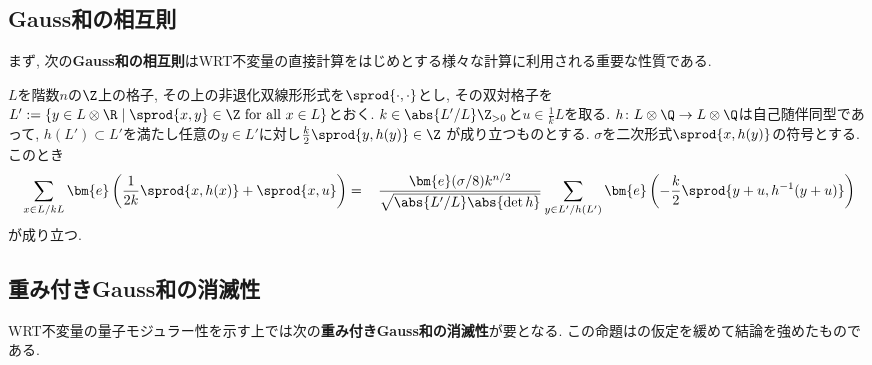 \documentclass[11pt,b5paper,oneside,lualatex]{ltjsarticle} %
\numberwithin{equation}{section} %
\begin{document}

\subsection{Gauss和の相互則} \label{subsec:reciprocity}


まず, 次の\textbf{Gauss和の相互則}はWRT不変量の直接計算をはじめとする様々な計算に利用される重要な性質である. 

\begin{prop}[{\cite[Theorem 1]{DT}}] \label{prop:reciprocity}
	$ L $を階数$ n $の$ \Z $上の格子, その上の非退化双線形形式を$ \sprod{\cdot, \cdot} $とし, その双対格子を
	$ L' := \{ y \in L \otimes \R \mid \sprod{x, y} \in \Z \text{ for all } x \in L \} $とおく.
	$ k \in \abs{L'/L} \Z_{>0} $と$ u \in \frac{1}{k} L $を取る. 
	$ h \colon L \otimes \Q \to L \otimes \Q $は自己随伴同型であって, $ h(L') \subset L' $を満たし任意の$ y \in L' $に対し$ \frac{k}{2} \sprod{y, h(y)} \in \Z $ が成り立つものとする. 
	$ \sigma $を二次形式$ \sprod{x, h(y)} $の符号とする. 
	このとき
	\begin{align}
		&\sum_{x \in L/kL} \bm{e} \left( \frac{1}{2k} \sprod{x, h(x)} + \sprod{x, u} \right)
		= \,
		&\frac{\bm{e}(\sigma/8) k^{n/2}}{\sqrt{\abs{L'/L} \abs{\det h}}}
		\sum_{y \in L'/h(L')} \bm{e} \left( -\frac{k}{2} \sprod{y + u, h^{-1}(y + u)} \right)
	\end{align}
	が成り立つ. 
\end{prop}


\subsection{重み付きGauss和の消滅性} \label{subsec:Gauss_sum_vanish}


WRT不変量の量子モジュラー性を示す上では次の\textbf{重み付きGauss和の消滅性}が要となる. 
この命題は\cite[Proposition 4.2 (ii), (iii)]{MM}の仮定を緩めて結論を強めたものである. 
\end{document}
